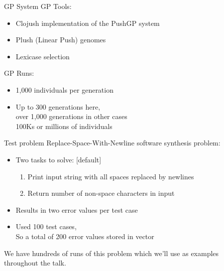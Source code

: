\documentclass{beamer}
\begin{document}
\begin{frame}{GP System}
GP Tools:
\vspace{.5em}
\begin{itemize}
    \setlength\itemsep{.5em}
	\item Clojush implementation of the PushGP system
	\item Plush (Linear Push) genomes~\cite{Helmuth:2016:GPTP}
	\item Lexicase selection~\cite{Helmuth:2014:ieeeTEC}
\end{itemize}
\vspace{1em}
GP Runs:
\begin{itemize}
    \item 1,000 individuals per generation
    \item Up to 300 generations here, 
    	\\ \hspace{.5cm} over 1,000 generations in other cases
        \\ \hspace{.5cm} 100Ks or millions of individuals
\end{itemize}
\end{frame}

\begin{frame}{Test problem}
Replace-Space-With-Newline software synthesis problem:
\vspace{.5em}
\begin{itemize}
    \setlength\itemsep{.5em}
	\item Two tasks to solve:
    [default]
    \begin{enumerate}
    	\item Print input string with all spaces replaced by newlines
        \item Return number of non-space characters in input
    \end{enumerate}
	\item Results in two error values per test case
	\item Used 100 test cases, \\ \hspace{.25cm} So a total of 200 error values stored in vector
\end{itemize}
\vspace{1em}
We have hundreds of runs of this problem which we'll use as examples throughout the talk.
\end{frame}
\end{document}
